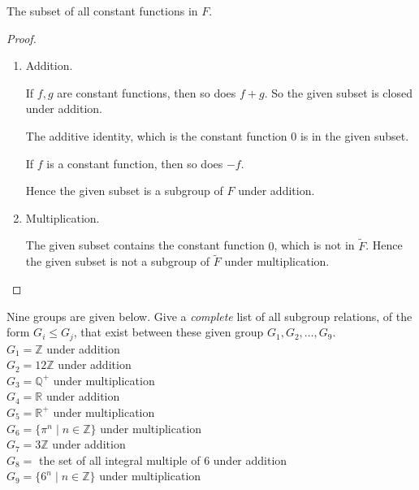 \begin{exercise}
    The subset of all constant functions in $F$.
\end{exercise}

\begin{proof}
    \begin{enumerate}[label={(\alph*)}]
        \item Addition.

              If $f, g$ are constant functions, then so does $f + g$. So the given subset is closed under addition.

              The additive identity, which is the constant function $0$ is in the given subset.

              If $f$ is a constant function, then so does $-f$.

              Hence the given subset is a subgroup of $F$ under addition.
        \item Multiplication.

              The given subset contains the constant function $0$, which is not in $\tilde{F}$. Hence the given subset is not a subgroup of $\tilde{F}$ under multiplication.
    \end{enumerate}
\end{proof}

\begin{exercise}
    Nine groups are given below. Give a \textit{complete} list of all subgroup relations, of the form $G_{i} \leq G_{j}$, that exist between these given group $G_{1}, G_{2}, \ldots, G_{9}$. \\
    $G_{1} = \mathbb{Z}$ under addition \\
    $G_{2} = 12\mathbb{Z}$ under addition \\
    $G_{3} = \mathbb{Q}^{+}$ under multiplication \\
    $G_{4} = \mathbb{R}$ under addition \\
    $G_{5} = \mathbb{R}^{+}$ under multiplication \\
    $G_{6} = \{ \pi^{n} \mid n\in\mathbb{Z} \}$ under multiplication \\
    $G_{7} = 3\mathbb{Z}$ under addition \\
    $G_{8} =$ the set of all integral multiple of $6$ under addition \\
    $G_{9} = \{ 6^{n} \mid n\in\mathbb{Z} \}$ under multiplication
\end{exercise}

